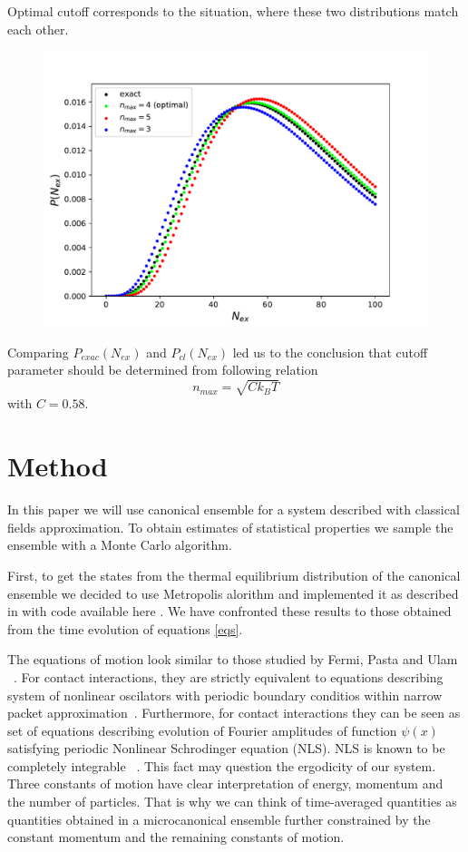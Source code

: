 \documentclass[aps,pra,reprint]{revtex4-2}
\begin{document}
    Optimal cutoff corresponds to the situation, where these two distributions match each other.
    \begin{figure}[H]
        \centering
        \includegraphics{distcomp.pdf}
    \end{figure}
    Comparing $P_{exac}(N_{ex})$ and $P_{cl}(N_{ex})$ led us to the conclusion that cutoff parameter should be determined from following relation
    \begin{equation}
    \label{eq:cutoff}
    n_{max} = \sqrt{C k_B T}
    \end{equation}
    with $C=0.58$.
 
 
 \section{Method}
     In this paper we will use canonical ensemble for a system described with classical fields approximation. To obtain estimates of statistical properties we sample the ensemble with a Monte Carlo algorithm.
     
     First, to get the states from the thermal equilibrium distribution of the canonical ensemble we decided to use Metropolis alorithm \cite{metropolis1953equation} and implemented it as described in \cite{metropolisImplementation} with code available here \cite{repoLink}. We have confronted these results to those  obtained from the time evolution of equations \ref{eqs}.
    
    The equations of motion look similar to those studied by Fermi, Pasta and Ulam ~\cite{fermi1955studies}. For contact interactions, they are strictly equivalent to equations describing system of nonlinear oscilators with periodic boundary conditios within narrow packet approximation~\cite{berman1984limit}. Furthermore, for contact interactions they can be seen as set of equations describing evolution of Fourier amplitudes of function $\psi(x)$ satisfying periodic Nonlinear Schrodinger equation (NLS). NLS is known to be completely integrable ~\cite{berman1984limit}. This fact may question the ergodicity of our system. Three constants of motion have clear interpretation of energy, momentum and the number of particles. That is why we can think of time-averaged quantities as quantities obtained in a microcanonical ensemble further constrained by the constant momentum and the remaining constants of motion.
\end{document}
